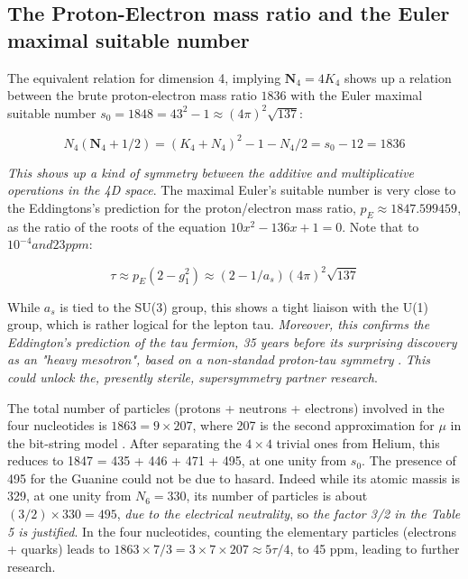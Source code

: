 \documentclass[a4paper,9pt]{article}
\begin{document}
\subsection{The Proton-Electron mass ratio and the Euler maximal suitable number} 

The equivalent relation for dimension 4, implying $\textbf{N}_4 = 4 K_4$ shows up a relation between the brute proton-electron mass ratio $1836$ with the Euler maximal suitable number $s_0 = 1848 = 43^2 -1 \approx (4\pi)^2\sqrt {137}$:

\begin{equation}\label{Eq27}
 N_4(\textbf{N}_4 + 1/2) = (K_4 + N_4)^2 - 1 - N_4/2 = s_0 - 12 = 1836
 \end{equation}

\textit{This shows up a kind of symmetry between the additive and multiplicative operations in the 4D space}. The maximal Euler's suitable number is very close to the Eddingtons's prediction \cite{Eddington} for the proton/electron mass ratio, $p_E \approx 1847.599459$, as the ratio of the roots of the equation $10x^2 - 136 x + 1 = 0$. Note that to $10^{-4} and 23 ppm$:

\begin{equation}\label{Eq28}
 \tau \approx p_E(2-g_1^2) \approx (2-1/a_s)(4\pi)^2\sqrt {137}
 \end{equation}
 
While $a_s$ is tied to the SU(3) group, this shows a tight liaison with the U(1) group, which is rather logical for the lepton tau. \textit {Moreover, this confirms the Eddington's prediction of the tau fermion, 35 years before its surprising discovery as an "heavy mesotron", based on a non-standad proton-tau symmetry} \cite{Eddington}. \textit{This could unlock the, presently sterile, supersymmetry partner research}. 
 
The total number of particles (protons + neutrons + electrons) involved in the four nucleotides is $1863 = 9\times 207$, where 207 is the second approximation for $\mu$ in the bit-string model \cite{Noyes}. After separating the $4\times4$ trivial ones from Helium, this reduces to 1847 = 435 + 446 + 471 + 495, at one unity from $s_0$. The presence of 495 for the Guanine could not be due to hasard. Indeed while its atomic massis is 329, at one unity from $N_6 = 330$, its number of particles is about $(3/2) \times 330 = 495$, \textit {due to the electrical neutrality}, so \textit {the factor 3/2 in the Table 5 is justified}. In the four nucleotides, counting the elementary particles (electrons + quarks) leads to $1863 \times 7/3 = 3 \times 7 \times 207 \approx 5\tau/4$, to 45 ppm, leading to further research.
\end{document}

